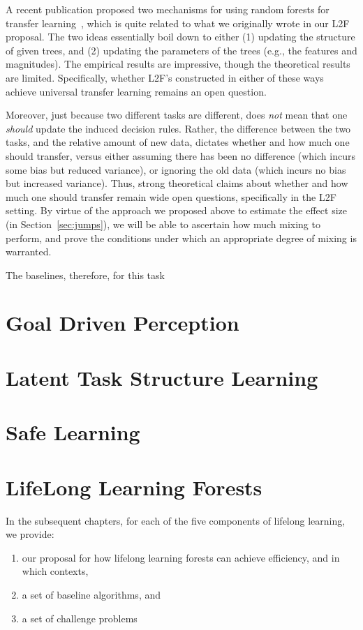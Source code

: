 \documentclass{article}
\begin{document}
A recent publication proposed two mechanisms for using random forests for transfer learning~\cite{Segev2016}, which is quite related to what we originally wrote in our L2F proposal. The two ideas essentially boil down to either (1) updating the structure of given trees, and (2) updating the parameters of the trees (e.g., the features and magnitudes).  The empirical results are impressive, though the theoretical results are limited.  Specifically, whether L2F's constructed in either of these ways achieve universal transfer learning remains an open question.  

Moreover, just because two different tasks are different, does \emph{not} mean that one \emph{should} update the induced decision rules.  Rather, the difference between the two tasks, and the relative amount of new data, dictates whether and how much one should transfer, versus either assuming there has been no difference (which incurs some bias but reduced variance), or ignoring the old data (which incurs no bias but increased variance).  Thus, strong theoretical claims about whether and how much one should transfer remain wide open questions, specifically in the L2F setting.  By virtue of the approach we proposed above to estimate the effect size (in Section~\ref{sec:jumps}), we will be able to ascertain how much mixing to perform, and prove the conditions under which an appropriate degree of mixing is warranted. 

The baselines, therefore, for this task 


\section{Goal Driven Perception}

\section{Latent Task Structure Learning}

\section{Safe Learning}


\appendix
\section{LifeLong Learning Forests}


In the subsequent chapters,  for each of the five components of lifelong learning, we provide:
\begin{enumerate}
    \item our proposal for how lifelong learning forests can achieve efficiency, and in which contexts,
    \item a set of baseline algorithms, and
    \item a set of challenge problems
\end{enumerate}
\end{document}
